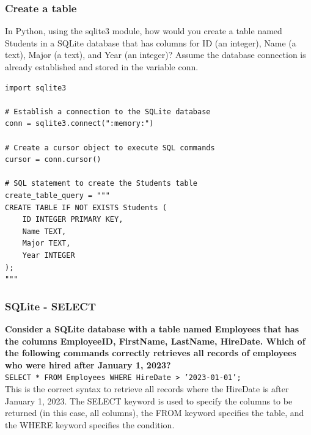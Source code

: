 \subsubsection{Create a table}
In Python, using the sqlite3 module, how would you create a table named Students in a SQLite database that has columns for ID (an integer), Name (a text), Major (a text), and Year (an integer)? Assume the database connection is already established and stored in the variable conn.
\begin{codebox}
\begin{verbatim}
import sqlite3

# Establish a connection to the SQLite database
conn = sqlite3.connect(":memory:")

# Create a cursor object to execute SQL commands
cursor = conn.cursor()

# SQL statement to create the Students table
create_table_query = """
CREATE TABLE IF NOT EXISTS Students (
    ID INTEGER PRIMARY KEY,
    Name TEXT,
    Major TEXT,
    Year INTEGER
);
"""
\end{verbatim}
\end{codebox}

\subsubsection{SQLite - SELECT}
\textbf{Consider a SQLite database with a table named Employees that has the columns EmployeeID, FirstName, LastName, HireDate. Which of the following commands correctly retrieves all records of employees who were hired after January 1, 2023?}\\

\texttt{SELECT * FROM Employees WHERE HireDate > '2023-01-01';}\\ This is the correct syntax to retrieve all records where the HireDate is after January 1, 2023. The SELECT keyword is used to specify the columns to be returned (in this case, all columns), the FROM keyword specifies the table, and the WHERE keyword specifies the condition.

\newpage
